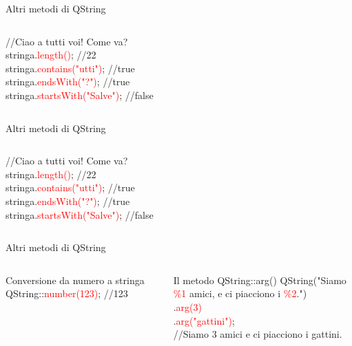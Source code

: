 \documentclass{beamer}
\begin{document}
\begin{frame}{Altri metodi di QString}
	\begin{columns}
		\begin{block}{}
			{\ttfamily //Ciao a tutti voi! Come va?\\
				\bigskip
				stringa.\textcolor{red}{length()}; //22\\
				\bigskip
				stringa.\textcolor{red}{contains("utti")}; //true\\
				\bigskip
				stringa.\textcolor{red}{endsWith("?")}; //true\\
				\bigskip
				stringa.\textcolor{red}{startsWith("Salve")}; //false}
		\end{block}
	\end{columns}
\end{frame}

\begin{frame}{Altri metodi di QString}
	\begin{columns}
		\column{0.7\textwidth}
		\begin{block}{}
			{\ttfamily //Ciao a tutti voi! Come va?\\
				\bigskip
				stringa.\textcolor{red}{length()}; //22\\
				\bigskip
				stringa.\textcolor{red}{contains("utti")}; //true\\
				\bigskip
				stringa.\textcolor{red}{endsWith("?")}; //true\\
				\bigskip
				stringa.\textcolor{red}{startsWith("Salve")}; //false}
		\end{block}
	\end{columns}
\end{frame}

\begin{frame}{Altri metodi di QString}
	\begin{columns}
		\column{0.8\textwidth}
		\begin{block}{Conversione da numero a stringa}
			{\ttfamily QString::\textcolor{red}{number(123)};  //123}
		\end{block}
		\bigskip

		\begin{block}{Il metodo QString::arg()}
			{\ttfamily QString("Siamo \textcolor{red}{\%1} amici, e ci piacciono i \textcolor{red}{\%2}.")\\
				.\textcolor{red}{arg(3)}\\
				.\textcolor{red}{arg("gattini")};\\
				//Siamo 3 amici e ci piacciono i gattini.}
		\end{block}
	\end{columns}
\end{frame}
\end{document}

